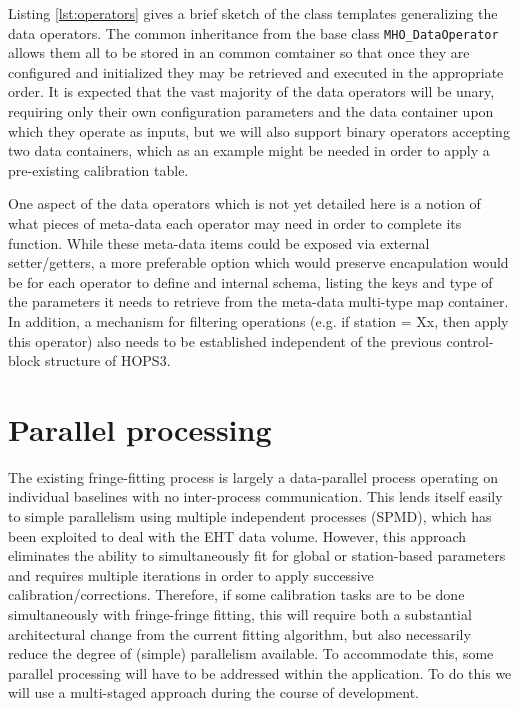 \documentclass[hidelinks]{article}
\let\Oldsection\section
\renewcommand{\section}{\FloatBarrier\Oldsection}
\begin{document}
Listing \ref{lst:operators} gives a brief sketch of the class templates generalizing the data operators. The common inheritance from the base class \texttt{MHO\_DataOperator} allows them all to be stored in an common comtainer so that once they are configured and initialized they may be retrieved
and executed in the appropriate order. It is expected that the vast majority of the data operators will be unary, requiring only their own configuration 
parameters and the data container upon which they operate as inputs, but we will also support binary operators accepting two data containers, which as
an example might be needed in order to apply a pre-existing calibration table.

One aspect of the data operators which is not yet detailed here is a notion of what pieces of meta-data each operator may need in order to complete its function.
While these meta-data items could be exposed via external setter/getters, a more preferable option which would preserve encapulation would be for each operator
to define and internal schema, listing the keys and type of the parameters it needs to retrieve from the meta-data multi-type map container. 
In addition, a mechanism for filtering operations (e.g. if station = Xx, then apply this operator) also needs to be established independent of the
previous control-block structure of HOPS3.




\section{Parallel processing}

The existing fringe-fitting process is largely a data-parallel process operating on individual baselines with no inter-process
communication. This lends itself easily to simple parallelism using multiple independent processes (SPMD), which has been exploited
\cite{blackburn2019eht} to deal with the EHT data volume. However, this approach eliminates the ability to simultaneously fit for global or station-based
parameters and requires multiple iterations in order to apply successive calibration/corrections. Therefore, if some calibration tasks are to be
done simultaneously with fringe-fringe fitting, this will require both a substantial architectural change from the current fitting algorithm, but
also necessarily reduce the degree of (simple) parallelism available. To accommodate this, some parallel processing will have to be addressed
within the application. To do this we will use a multi-staged approach during the course of development.
\end{document}
